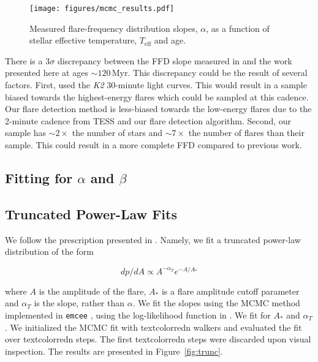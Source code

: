 \documentclass[twocolumn]{aastex631}
\begin{document}
\begin{figure*}[ht!]
    \begin{centering}
        \texttt{[image: figures/mcmc\_results.pdf]}
        \caption{
            Measured flare-frequency distribution slopes, $\alpha$, as a function
            of stellar effective temperature, $T_\textrm{eff}$ and age.
        }
        \label{fig:mcmc_results}
    \end{centering}
\end{figure*}

There is a $3\sigma$ discrepancy between the FFD slope measured in \cite{ilin21}
and the work presented here at ages $\sim 120$\,Myr. This discrepancy could be the
result of several factors. First, \cite{ilin21} used the \textit{K2} 30-minute
light curves. This would result in a sample biased towards the highest-energy flares which
could be sampled at this cadence. Our flare detection method is less-biased towards
the low-energy flares due to the 2-minute cadence from TESS and our flare detection
algorithm. Second, our sample has $\sim 2\times$ the number
of stars and $\sim 7\times$ the number of flares than their sample. This could
result in a more complete FFD compared to previous work.


\subsection{Fitting for $\alpha$ and $\beta$}


\subsection{Truncated Power-Law Fits}

We follow the prescription presented in \cite{seligman22}. Namely, we fit a truncated
power-law distribution of the form

\begin{equation}
  dp/dA \propto A^{-\alpha_T} e^{-A/A_*}
\end{equation}

where $A$ is the amplitude of the flare, $A_*$ is a flare amplitude cutoff parameter
and $\alpha_T$ is the slope, rather than
$\alpha$. We fit the slopes using the MCMC method implemented in \texttt{emcee}
\citep{goodman10, emcee}, using the log-likelihood function in \cite{seligman22}.
We fit for $A_*$ and $\alpha_T$. We initialized the MCMC fit with textcolor{red}{n}
walkers and evaluated the fit over textcolor{red}{n} steps. The first textcolor{red}{n}
steps were discarded upon visual inspection. The results are presented in Figure~\ref{fig:trunc}.
\end{document}

